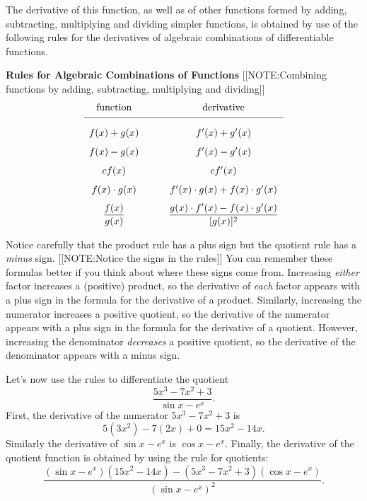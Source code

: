 	   The derivative of this function, as well as of other functions formed by adding, subtracting, multiplying and dividing simpler functions, is  obtained by use of the following rules for the derivatives of algebraic combinations of differentiable functions.



\begin{center}

{\bf Rules for Algebraic Combinations of Functions}
[[NOTE:Combining functions by adding, subtracting, multiplying and dividing]]
\[
\begin{array}{cccc}
   \mbox{function}    & &        &\mbox{derivative} \\[.05in]  \hline

  \mbox{\rule{0in}{.25in}$f(x) + g(x)$}           & & &\mbox{\rule{0in}{.25in}$f'(x) + g'(x)$}       \\[.1in]
        f(x) - g(x)     & &      &f'(x) - g'(x)  \\[.1in]
        cf(x)           & &      &cf'(x)  \\[.1in]
        f(x)\cdot g(x)     &  &       &f'(x)\cdot g(x) + f(x)\cdot g'(x)  \\[.1in]
\displaystyle{\frac{f(x)}{g(x)}}   & &
&\displaystyle{ \frac{g(x)\cdot f'(x)-f(x)\cdot g'(x)}{[g(x)]^2} }
\end{array}
\]
\end{center}
Notice carefully that the product rule has a plus sign but the quotient rule has a {\em minus\/} sign.  
	[[NOTE:Notice the signs  in the rules]]
You can remember these formulas better if you think about where these signs come from.  Increasing {\em either\/} factor increases a (positive) product, so the derivative of {\em each\/} factor  appears with a plus sign in the formula for the derivative of a product.  Similarly, increasing the numerator increases a positive quotient, so the derivative of the numerator appears with a plus sign in the formula for the derivative of a quotient.  However, increasing the denominator {\em decreases\/} a positive quotient, so the derivative of the denominator appears with a minus sign.

	Let's now use the rules to differentiate the quotient
	\[
\dfrac{5x^3-7x^2+3}{\sin{x} -e^x}.
\]
First, the derivative of the numerator $5x^{3}-7x^{2}+3$ is 
\[
5(3x^{2}) - 7(2x) + 0 = 15x^{2} - 14x.
\]
Similarly the derivative of $\sin{x} - e^x$ is $\cos{x} - e^x$.  Finally, the derivative of the quotient function is obtained by using the rule for quotients:
	\[
\frac{(\sin{x} - e^x)(15x^{2} - 14x) - (5x^{3} - 7x^{2} + 3)(\cos{x} - e^x)}
{(\sin{x} - e^x)^{2}}.
\]



